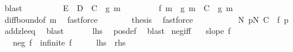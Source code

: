 \begin{isabellebody}
\ blast\isanewline
\ \ \ \ \ \ \isamarkupfalse%
\ \isamarkupfalse%
\ {\isachardoublequoteopen}E\ {\isacharplus}{\kern0pt}\ D\ {\isacharplus}{\kern0pt}\ C\ {\isacharless}{\kern0pt}\ g\ m{\isachardoublequoteclose}\ \isacommand{{\isachardot}{\kern0pt}}\isamarkupfalse%
\isanewline
\ \ \ \ \ \ \isamarkupfalse%
\ {\isachardoublequoteopen}{\isasymbar}f\ m\ {\isacharminus}{\kern0pt}\ g\ m{\isasymbar}\ {\isacharplus}{\kern0pt}\ C\ {\isacharless}{\kern0pt}\ g\ m{\isachardoublequoteclose}\ \isamarkupfalse%
\ diff{\isacharunderscore}{\kern0pt}bound{\isacharbrackleft}{\kern0pt}of\ m{\isacharbrackright}{\kern0pt}\ \isamarkupfalse%
\ fastforce\isanewline
\ \ \ \ \ \ \isamarkupfalse%
\ {\isacharquery}{\kern0pt}thesis\ \isamarkupfalse%
\ fastforce\isanewline
\ \ \ \ \isamarkupfalse%
\isanewline
\ \ \ \ \isamarkupfalse%
\ {\isachardoublequoteopen}{\isasymexists}N{\isachardot}{\kern0pt}\ {\isasymforall}p{\isasymge}N{\isachardot}{\kern0pt}\ C\ {\isasymle}\ f\ p{\isachardoublequoteclose}\ \isamarkupfalse%
\ add{}{\isacharunderscore}{\kern0pt}zle{\isacharunderscore}{\kern0pt}eq\ \isamarkupfalse%
\ blast\isanewline
\ \ \isacommand{{\isacharbraceright}{\kern0pt}}\isamarkupfalse%
\isanewline
\ \ \isamarkupfalse%
\ {\isacharquery}{\kern0pt}lhs\ \isamarkupfalse%
\ pos{\isacharunderscore}{\kern0pt}def\ \isamarkupfalse%
\ blast\isanewline
{}\isamarkupfalse%
%
\endisatagproof
{\isafoldproof}%
%
\isadelimproof
\isanewline
%
\endisadelimproof
\isanewline
{}\isamarkupfalse%
\ neg{\isacharunderscore}{\kern0pt}iff{\isacharcolon}{\kern0pt}\isanewline
\ \ \ {\isachardoublequoteopen}slope\ f{\isachardoublequoteclose}\isanewline
\ \ \ {\isachardoublequoteopen}neg\ f\ {\isacharequal}{\kern0pt}\ infinite\ {\isacharparenleft}{\kern0pt}f\ {\isacharbackquote}{\kern0pt}\ {\isacharbraceleft}{\kern0pt}{}{\isachardot}{\kern0pt}{\isachardot}{\kern0pt}{\isacharbraceright}{\kern0pt}\ {\isasyminter}\ {\isacharbraceleft}{\kern0pt}{\isachardot}{\kern0pt}{\isachardot}{\kern0pt}{\isacharless}{\kern0pt}{}{\isacharbraceright}{\kern0pt}{\isacharparenright}{\kern0pt}{\isachardoublequoteclose}\ {\isacharparenleft}{\kern0pt}\ {\isachardoublequoteopen}{\isacharquery}{\kern0pt}lhs\ {\isacharequal}{\kern0pt}\ {\isacharquery}{\kern0pt}rhs{\isachardoublequoteclose}{\isacharparenright}{\kern0pt}\isanewline

\end{isabellebody}
